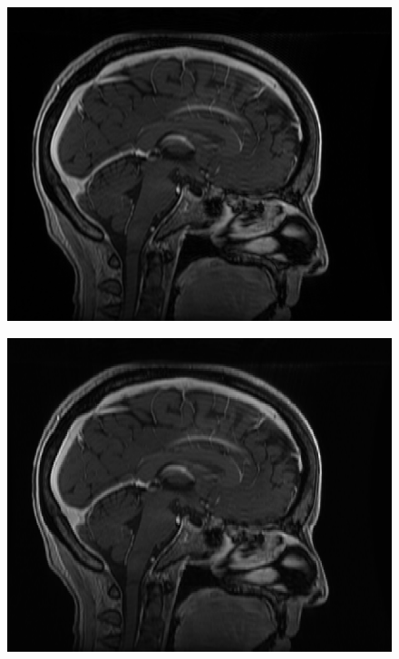 \documentclass[fleqn,a4paper,oneside,openany]{book}
\begin{document}
\begin{figure}
\centering
   \begin{minipage}[b]{140pt}
     \centering
     \includegraphics[trim = 0 0 0 0, clip, scale=0.38]{radiomics_filtering/filtered_image_1mm_spacing_none.png}
     \label{fig:radiomics_filter_1mm_original}
     \hspace{100pt}
   \end{minipage}
   \begin{minipage}[b]{140pt}
     \centering
     \includegraphics[trim = 0 0 0 0, clip, scale=0.38]{radiomics_filtering/filtered_image_1mm_spacing_lo.png}

\end{minipage}
\end{figure}
\end{document}
